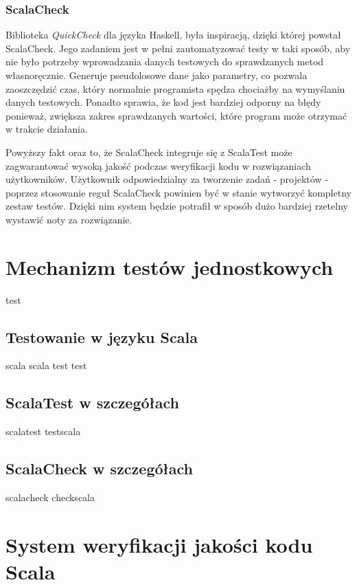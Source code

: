 \documentclass[brudnopis]{xmgr}
\begin{document}
\subsection{ScalaCheck}

Biblioteka \emph{QuickCheck} dla języka Haskell, była inspiracją, dzięki której powstał ScalaCheck. Jego zadaniem jest w pełni zautomatyzować testy w taki sposób, aby nie było potrzeby wprowadzania danych testowych do sprawdzanych metod własnoręcznie. Generuje pseudolosowe dane jako parametry, co pozwala zaoszczędzić czas, który normalnie programista spędza chociażby na wymyślaniu danych testowych. Ponadto sprawia, że kod jest bardziej odporny na błędy ponieważ, zwiększa zakres sprawdzanych wartości, które program może otrzymać w trakcie działania.

Powyższy fakt oraz to, że ScalaCheck integruje się z ScalaTest może zagwarantować wysoką jakość podczas weryfikacji kodu w rozwiązaniach użytkowników. Użytkownik odpowiedzialny za tworzenie zadań - projektów - poprzez stosowanie reguł ScalaCheck powinien być w stanie wytworzyć kompletny zestaw testów. Dzięki nim system będzie potrafił w sposób dużo bardziej rzetelny wystawić noty za rozwiązanie.
      
\chapter{Mechanizm testów jednostkowych}

test
    
\section{Testowanie w języku Scala}

scala scala test test 
      
\section{ScalaTest w szczegółach}

scalatest testscala

\section{ScalaCheck w szczegółach}

scalacheck checkscala

\chapter{System weryfikacji jakości kodu Scala}
\end{document}
